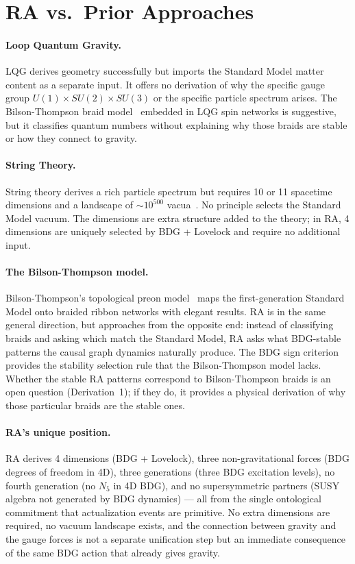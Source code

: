 \documentclass[11pt,a4paper]{article}
\begin{document}
\section{RA vs.\ Prior Approaches}
\label{sec:comparison}

\paragraph{Loop Quantum Gravity.} LQG derives geometry successfully but imports
the Standard Model matter content as a separate input. It offers no derivation
of why the specific gauge group $U(1) \times SU(2) \times SU(3)$ or the specific
particle spectrum arises. The Bilson-Thompson braid model~\citep{BilsonThompson2005}
embedded in LQG spin networks is suggestive, but it classifies quantum numbers
without explaining why those braids are stable or how they connect to gravity.

\paragraph{String Theory.} String theory derives a rich particle spectrum but
requires 10 or 11 spacetime dimensions and a landscape of $\sim 10^{500}$
vacua~\citep{Susskind2003}. No principle selects the Standard Model vacuum.
The dimensions are extra structure added to the theory; in RA, 4 dimensions
are uniquely selected by BDG + Lovelock and require no additional input.

\paragraph{The Bilson-Thompson model.} Bilson-Thompson's topological preon
model~\citep{BilsonThompson2005} maps the first-generation Standard Model
onto braided ribbon networks with elegant results. RA is in the same general
direction, but approaches from the opposite end: instead of classifying braids
and asking which match the Standard Model, RA asks what BDG-stable patterns
the causal graph dynamics naturally produce. The BDG sign criterion provides
the stability selection rule that the Bilson-Thompson model lacks. Whether the
stable RA patterns correspond to Bilson-Thompson braids is an open question
(Derivation~1); if they do, it provides a physical derivation of why those
particular braids are the stable ones.

\paragraph{RA's unique position.} RA derives 4 dimensions (BDG + Lovelock),
three non-gravitational forces (BDG degrees of freedom in 4D), three generations
(three BDG excitation levels), no fourth generation (no $N_5$ in 4D BDG), and
no supersymmetric partners (SUSY algebra not generated by BDG dynamics) ---
all from the single ontological commitment that actualization events are
primitive. No extra dimensions are required, no vacuum landscape exists, and
the connection between gravity and the gauge forces is not a separate
unification step but an immediate consequence of the same BDG action that
already gives gravity.
\end{document}
